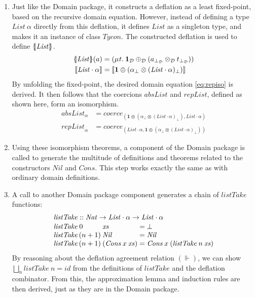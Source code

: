 \documentclass{sigplanconf}
\newcommand{\D}{\ensuremath{\mathcal{D}}}
\newcommand{\REP}[1]{\ensuremath{\llbracket#1\rrbracket}}
\newcommand{\symlbrace}{\mathopen{\lbrace\mkern-4.5mu\mid}}
\newcommand{\symrbrace}{\mathclose{\mid\mkern-4.5mu\rbrace}}
\newcommand{\TC}[1]{\ensuremath{\symlbrace#1\symrbrace}}
\newcommand{\hsone}{\mathbf{1}}
\newcommand{\hair}{\mskip1mu}
\newcommand{\hsc}[1]{\ensuremath{\mathit{#1}}}
\newcommand{\hsid}{\hsc{id}}
\newcommand{\hscoerce}{\hsc{coerce}}
\newcommand{\tA}{\alpha}
\newcommand{\isodefl}{\Vdash}
\theoremstyle{definition}
\begin{document}
\begin{enumerate}

\item

Just like the Domain package, it constructs a deflation as a least fixed-point, based on the recursive domain equation. However, instead of defining a type $\hsc{List}\:\tA$ directly from this deflation, it defines \hsc{List} as a singleton type, and makes it an instance of class \hsc{Tycon}. The constructed deflation is used to define $\TC{\hsc{List}}$.
%
\begin{align}
\TC{\hsc{List}}(a) & = (\mu\hair{t}.\:\hsone_\D \oplus_\D (a_{\bot_\D} \otimes_\D t_{\bot_\D})) \\
\label{eq:repiso}
\REP{\hsc{List}\cdot\tA} & = \REP{\hsone \oplus (\tA_\bot \otimes (\hsc{List}\cdot\tA)_\bot)}
\end{align}
%
By unfolding the fixed-point, the desired domain equation \eqref{eq:repiso} is derived. It then follows that the coercions \hsc{absList} and \hsc{repList}, defined as shown here, form an isomorphism.
%
\begin{align*}
\hsc{absList}_\tA & = \hscoerce_{(\hsone \oplus (\tA_\bot \otimes (\hsc{List}\cdot\tA)_\bot), \hsc{List}\cdot\tA)} \\
\hsc{repList}_\tA & = \hscoerce_{(\hsc{List}\cdot\tA, \hsone \oplus (\tA_\bot \otimes (\hsc{List}\cdot\tA)_\bot))}
\end{align*}

\item

Using these isomorphism theorems, a component of the Domain package is called to generate the multitude of definitions and theorems related to the constructors \hsc{Nil} and \hsc{Cons}. This step works exactly the same as with ordinary domain definitions.

\item

A call to another Domain package component generates a chain of \hsc{listTake} functions:
%
\begin{align*}
  &
  \begin{alignedat}{3}
    & \hsc{listTake} :: \hsc{Nat} \to \hsc{List}\cdot\tA \to \hsc{List}\cdot\tA
  \end{alignedat}
  \\[-\jot] &
  \begin{alignedat}{3}
    & \hsc{listTake}\:0 && \hsc{xs} &&= \bot \\[-\jot]
    & \hsc{listTake}\,(n+1)\:&&\hsc{Nil} &&= \hsc{Nil}\\[-\jot]
    & \hsc{listTake}\,(n+1)\:&&(\hsc{Cons}\:x\:\hsc{xs})
    &&= \hsc{Cons}\:x\:(\hsc{listTake}\:n\:\hsc{xs})
  \end{alignedat}
\end{align*}
%
By reasoning about the deflation agreement relation $(\isodefl)$, we can show
$\bigsqcup_n \hsc{listTake}\:n = \hsid$ from the definitions of \hsc{listTake} and the deflation combinator. From this, the approximation lemma \cite{Hutton2001} and induction rules are then derived, just as they are in the Domain package.


\end{enumerate}
\end{document}
